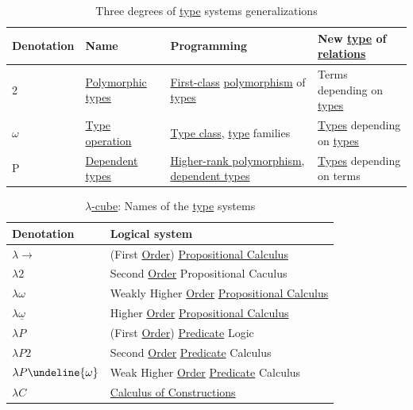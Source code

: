 \documentclass[a4paper,14pt,oneside]{book}
\begin{document}
\begin{table}[htbp]
\caption{\label{tab--lambda-calculus-generalizations}Three degrees of \hyperref[org6ce6dd7]{type} systems generalizations}
\centering
\begin{tabular}{llll}
Denotation & Name & Programming & New \hyperref[org6ce6dd7]{type} of \hyperref[orgec5cac9]{relations}\\
\hline
2 & \hyperref[org115ca68]{Polymorphic} \hyperref[orgc3d0384]{types} & \hyperref[orgae7b00e]{First-class} \hyperref[org213a613]{polymorphism} of \hyperref[orgc3d0384]{types} & Terms depending on \hyperref[orgc3d0384]{types}\\
\(\omega\) & \hyperref[org6ce6dd7]{Type} \hyperref[org5c15033]{operation} & \hyperref[org7fe2fa6]{Type class}, \hyperref[org6ce6dd7]{type} families & \hyperref[orgc3d0384]{Types} depending on \hyperref[orgc3d0384]{types}\\
P & \hyperref[org774f4f0]{Dependent types} & \hyperref[orgc9af927]{Higher-rank polymorphism}, \hyperref[org774f4f0]{dependent types} & \hyperref[orgc3d0384]{Types} depending on terms\\
\end{tabular}
\end{table}

\begin{table}[htbp]
\caption{\label{tab--lambda-calculus-names}\hyperref[org72fcc4c]{\(\lambda\)-cube}: Names of the \hyperref[org6ce6dd7]{type} systems}
\centering
\begin{tabular}{ll}
Denotation & Logical system\\
\hline
\(\lambda\to\) & (First \hyperref[orgd8cbd41]{Order}) \hyperref[org7d9d631]{Propositional Calculus}\\
\(\lambda2\) & Second \hyperref[orgd8cbd41]{Order} Propositional Caculus\\
\(\lambda\omega\) & Weakly Higher \hyperref[orgd8cbd41]{Order} \hyperref[org7d9d631]{Propositional Calculus}\\
\(\lambda \underline{\omega}\) & Higher \hyperref[orgd8cbd41]{Order} \hyperref[org7d9d631]{Propositional Calculus}\\
\(\lambda P\) & (First \hyperref[orgd8cbd41]{Order}) \hyperref[orgae082b4]{Predicate} Logic\\
\(\lambda P 2\) & Second \hyperref[orgd8cbd41]{Order} \hyperref[orgae082b4]{Predicate} Calculus\\
\(\lambda P \undeline{\omega}\) & Weak Higher \hyperref[orgd8cbd41]{Order} \hyperref[orgae082b4]{Predicate} Calculus\\
\(\lambda C\) & \hyperref[org14de08c]{Calculus of Constructions}\\
\end{tabular}
\end{table}
\end{document}
